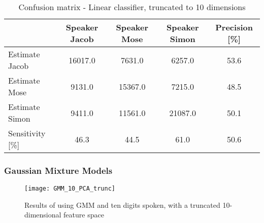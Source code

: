 \begin{table}[H]                                                           
\centering                                                                 
\begin{tabular}{|l|c|c|c|c|}                                               
\hline                                                                     
  & Speaker Jacob & Speaker Mose & Speaker Simon & Precision [\%] \\       
\hline                                                                     
Estimate Jacob & 16017.0 & 7631.0 & 6257.0 & 53.6 \\                       
\hline                                                                     
Estimate Mose & 9131.0 & 15367.0 & 7215.0 & 48.5 \\                        
\hline                                                                     
Estimate Simon & 9411.0 & 11561.0 & 21087.0 & 50.1 \\                      
\hline                                                                     
Sensitivity [\%] & 46.3 & 44.5 & 61.0 & 50.6 \\                            
\hline                                                                     
\end{tabular}                                                              
\caption{Confusion matrix - Linear classifier, truncated to 10 dimensions}
\label{table:Lin_conf_10_trunc}                                            
\end{table} 


\subsubsection{Gaussian Mixture Models}

\begin{figure}[H]
\centering
\texttt{[image: GMM\_10\_PCA\_trunc]}
\caption{Results of using GMM and ten digits spoken, with a truncated 10-dimensional feature space}
\label{fig:PCA_GMM_trunc}
\end{figure}

